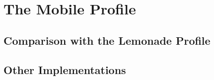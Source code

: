 \documentclass[trojita]{subfiles}
\begin{document}
\chapter{The Mobile Profile}

\section{Comparison with the Lemonade Profile}
\label{sec:lemonade-comparison}

\section{Other Implementations}
\end{document}
